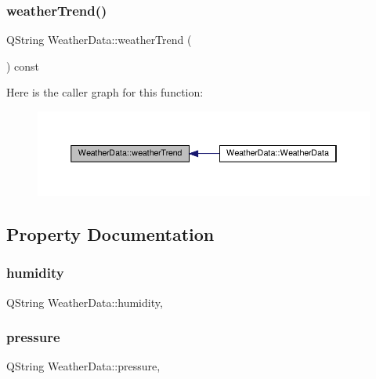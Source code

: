 \subsubsection{\texorpdfstring{weather\+Trend()}{weatherTrend()}}
{\footnotesize\ttfamily Q\+String Weather\+Data\+::weather\+Trend (\begin{DoxyParamCaption}{ }\end{DoxyParamCaption}) const}

Here is the caller graph for this function\+:\nopagebreak
\begin{figure}[H]
\begin{center}
\leavevmode
\includegraphics[width=350pt]{class_weather_data_a04b09d8065d64b62f1ad679b4493fc62_icgraph}
\end{center}
\end{figure}


\subsection{Property Documentation}
\mbox{\label{class_weather_data_acf762ef73e6056b6cc8716e1aa1c7220}} 
\subsubsection{\texorpdfstring{humidity}{humidity}}
{\footnotesize\ttfamily Q\+String Weather\+Data\+::humidity\hspace{0.3cm}{\ttfamily [read]}, {\ttfamily [write]}}

\mbox{\label{class_weather_data_a2529c61089c163abf0e2dd80a51c47cb}} 
\subsubsection{\texorpdfstring{pressure}{pressure}}
{\footnotesize\ttfamily Q\+String Weather\+Data\+::pressure\hspace{0.3cm}{\ttfamily [read]}, {\ttfamily [write]}}

